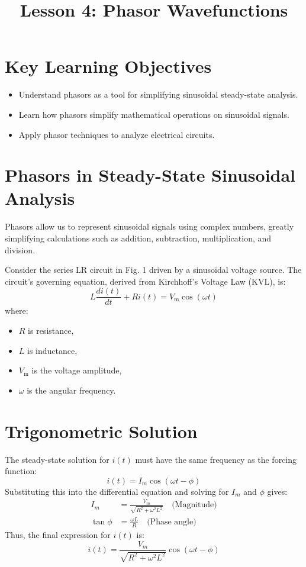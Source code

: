 \documentclass{article}
\title{Lesson 4: Phasor Wavefunctions}
\author{}
\date{}
\begin{document}
\maketitle

\section{Key Learning Objectives}
\begin{itemize}
    \item Understand phasors as a tool for simplifying sinusoidal steady-state analysis.
    \item Learn how phasors simplify mathematical operations on sinusoidal signals.
    \item Apply phasor techniques to analyze electrical circuits.
\end{itemize}

\section{Phasors in Steady-State Sinusoidal Analysis}
Phasors allow us to represent sinusoidal signals using complex numbers, greatly simplifying calculations such as addition, subtraction, multiplication, and division.

Consider the series LR circuit in Fig. 1 driven by a sinusoidal voltage source. The circuit's governing equation, derived from Kirchhoff's Voltage Law (KVL), is:
\begin{equation}
    L \frac{di(t)}{dt} + R i(t) = V_{\text{m}} \cos(\omega t)
\end{equation}
where:
\begin{itemize}
    \item $R$ is resistance,
    \item $L$ is inductance,
    \item $V_{\text{m}}$ is the voltage amplitude,
    \item $\omega$ is the angular frequency.
\end{itemize}

\section{Trigonometric Solution}
The steady-state solution for $i(t)$ must have the same frequency as the forcing function:
\begin{equation}
    i(t) = I_m \cos(\omega t - \phi)
\end{equation}
Substituting this into the differential equation and solving for $I_m$ and $\phi$ gives:
\begin{align}
    I_m &= \frac{V_m}{\sqrt{R^2 + \omega^2 L^2}} \quad \text{(Magnitude)} \\
    \tan \phi &= \frac{\omega L}{R} \quad \text{(Phase angle)}
\end{align}
Thus, the final expression for $i(t)$ is:
\begin{equation}
    i(t) = \frac{V_m}{\sqrt{R^2 + \omega^2 L^2}} \cos(\omega t - \phi)
\end{equation}
\end{document}
